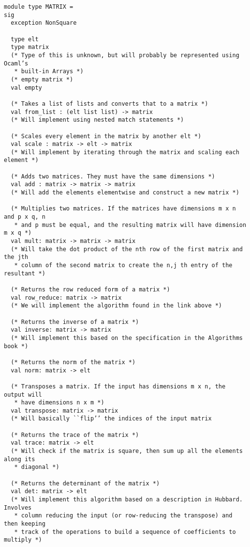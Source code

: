 \documentclass[letterpaper,11pt]{article}
\begin{document}
\begin{verbatim}
module type MATRIX = 
sig
  exception NonSquare
  
  type elt
  type matrix
  (* Type of this is unknown, but will probably be represented using Ocaml’s
   * built-in Arrays *)
  (* empty matrix *)
  val empty

  (* Takes a list of lists and converts that to a matrix *)
  val from_list : (elt list list) -> matrix
  (* Will implement using nested match statements *)

  (* Scales every element in the matrix by another elt *)
  val scale : matrix -> elt -> matrix
  (* Will implement by iterating through the matrix and scaling each element *)

  (* Adds two matrices. They must have the same dimensions *)
  val add : matrix -> matrix -> matrix
  (* Will add the elements elementwise and construct a new matrix *)

  (* Multiplies two matrices. If the matrices have dimensions m x n and p x q, n
   * and p must be equal, and the resulting matrix will have dimension m x q *)
  val mult: matrix -> matrix -> matrix
  (* Will take the dot product of the nth row of the first matrix and the jth
   * column of the second matrix to create the n,j th entry of the resultant *)

  (* Returns the row reduced form of a matrix *)
  val row_reduce: matrix -> matrix 
  (* We will implement the algorithm found in the link above *)

  (* Returns the inverse of a matrix *)
  val inverse: matrix -> matrix
  (* Will implement this based on the specification in the Algorithms book *)

  (* Returns the norm of the matrix *)
  val norm: matrix -> elt

  (* Transposes a matrix. If the input has dimensions m x n, the output will
   * have dimensions n x m *)
  val transpose: matrix -> matrix
  (* Will basically ``flip’’ the indices of the input matrix

  (* Returns the trace of the matrix *)
  val trace: matrix -> elt
  (* Will check if the matrix is square, then sum up all the elements along its
   * diagonal *)

  (* Returns the determinant of the matrix *)
  val det: matrix -> elt
  (* Will implement this algorithm based on a description in Hubbard. Involves
   * column reducing the input (or row-reducing the transpose) and then keeping 
   * track of the operations to build a sequence of coefficients to multiply *)


\end{verbatim}
\end{document}
